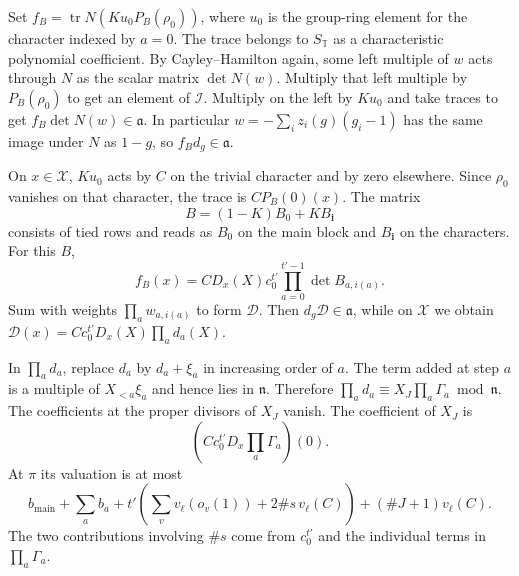 Set \(f_B=\operatorname{tr}N(Ku_0P_B(\rho_0))\), where \(u_0\)
is the group-ring element for the character indexed by \(a=0\).
The trace belongs to \(S_{\mathbb T}\) as a characteristic
polynomial coefficient. By Cayley--Hamilton again, some left
multiple of \(w\) acts through \(N\) as the scalar matrix
\(\det N(w)\). Multiply that left multiple by \(P_B(\rho_0)\)
to get an element of \(\mathscr I\). Multiply on the left by
\(Ku_0\) and take traces to get \(f_B\det N(w)\in\mathfrak a\).
In particular \(w=-\sum_i z_i(g)(g_i-1)\) has the same image
under \(N\) as \(1-g\), so \(f_Bd_g\in\mathfrak a\).

On \(x\in\mathcal X\), \(Ku_0\) acts by \(C\) on the trivial
character and by zero elsewhere. Since \(\rho_0\) vanishes on
that character, the trace is \(C P_B(0)(x)\).
The matrix
\[
 B=(1-K)B_0+KB_{\mathbf i}
\]
consists of tied rows and reads as \(B_0\) on the main block
and \(B_{\mathbf i}\) on the characters. For this \(B\),
\[
 f_B(x)=C D_x(X)c_0^{t'}
                \prod_{a=0}^{t'-1}\det B_{a,i(a)}.
\]
Sum with weights \(\prod_a w_{a,i(a)}\) to form \(\mathcal D\).
Then \(d_g\mathcal D\in\mathfrak a\), while on \(\mathcal X\)
we obtain \(\mathcal D(x)=C c_0^{t'}D_x(X)\prod_a d_a(X)\).

In \(\prod_a d_a\), replace \(d_a\) by \(d_a+\xi_a\) in increasing
order of \(a\). The term added at step \(a\) is a multiple of
\(X_{<a}\xi_a\) and hence lies in \(\mathfrak n\).
Therefore \(\prod_a d_a\equiv X_J\prod_a\Gamma_a\bmod\mathfrak n\).
The coefficients at the proper divisors of \(X_J\) vanish.
The coefficient of \(X_J\) is
\[
 (C c_0^{t'}D_x\prod_a\Gamma_a)(0).
\]
At \(\pi\) its valuation is at most
\[
 b_{\mathrm{main}}+\sum_a b_a+
 t'\!\left(\sum_v v_\ell(o_v(1))+2\#s\,v_\ell(C)\right)
       +(\#J+1)v_\ell(C).
\]
The two contributions involving \(\#s\) come from \(c_0^{t'}\)
and the individual terms in \(\prod_a\Gamma_a\).
